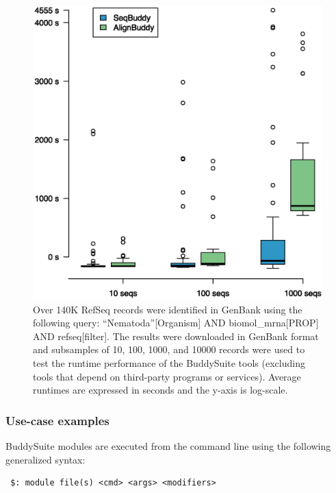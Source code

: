 \documentclass[nogrid]{MBE_article}%
\begin{document}
\begin{figure}[t]
\begin{center}
\includegraphics[height=0.4\textheight]{figures/timeit.eps}
\end{center}
\caption{Over 140K RefSeq records were identified in GenBank using the following query: ``Nematoda''[Organism] AND biomol\_mrna[PROP] AND refseq[filter]. The results were downloaded in GenBank format and subsamples of 10, 100, 1000, and 10000 records were used to test the runtime performance of the BuddySuite tools (excluding tools that depend on third-party programs or services). Average runtimes are expressed in seconds and the y-axis is log-scale.}
\label{fig:timeit}
\end{figure}

\subsubsection{Use-case examples}
BuddySuite modules are executed from the command line using the following generalized syntax:

\smallskip

{\small
\begin{verbatim}
 $: module file(s) <cmd> <args> <modifiers>
\end{verbatim}
}
\smallskip
\end{document}
